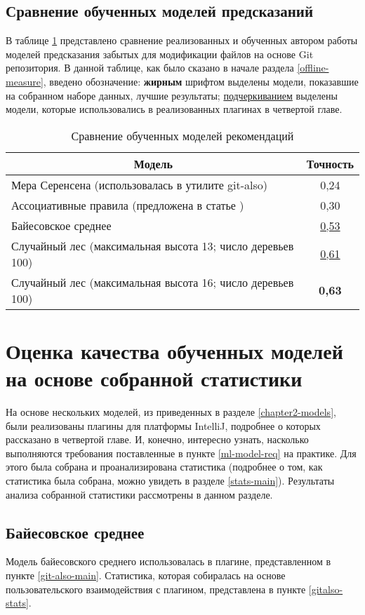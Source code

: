     \subsection{Сравнение обученных моделей предсказаний}
    В таблице \ref{all-offline-result-table} представлено сравнение реализованных и обученных автором работы моделей предсказания забытых для модификации файлов на основе Git репозитория. В данной таблице, как было сказано в начале раздела \ref{offline-measure}, введено обозначение: \textbf{жирным} шрифтом выделены модели, показавшие на собранном наборе данных, лучшие результаты; \uline{подчеркиванием} выделены модели, которые использовались в реализованных плагинах в четвертой главе.
    \begin{table}[!h]
        \caption{Сравнение обученных моделей рекомендаций}\label{all-offline-result-table}
        \centering
        \begin{tabular}{|l|c|}\hline
        \multicolumn{1}{|c|}{\textbf{Модель}} & \textbf{Точность}\\\hline
        Мера Серенсена (использовалась в утилите git-also) & 0,24\\\hline
        Ассоциативные правила (предложена в статье \cite{hagward2015using}) & 0,30\\\hline
        Байесовское среднее & \uline{0,53}\\\hline
        Случайный лес (максимальная высота 13; число деревьев 100) & \uline{0,61}\\\hline
        Случайный лес (максимальная высота 16; число деревьев 100) & \textbf{0,63}\\\hline
        \end{tabular}
        \end{table}

\section{Оценка качества обученных моделей на основе собранной статистики}
На основе нескольких моделей, из приведенных в разделе \ref{chapter2-models}, были реализованы плагины для платформы IntelliJ, подробнее о которых рассказано в четвертой главе. И, конечно, интересно узнать, насколько выполняются требования поставленные в пункте \ref{ml-model-req} на практике. Для этого была собрана и проанализирована статистика (подробнее о том, как статистика была собрана, можно увидеть в разделе \ref{stats-main}). Результаты анализа собранной статистики рассмотрены в данном разделе.
    \subsection{Байесовское среднее}\label{bayes-quality-online}
Модель байесовского среднего использовалась в плагине, представленном в пункте \ref{git-also-main}. Статистика, которая собиралась на основе пользовательского взаимодействия с плагином, представлена в пункте \ref{gitalso-stats}.

